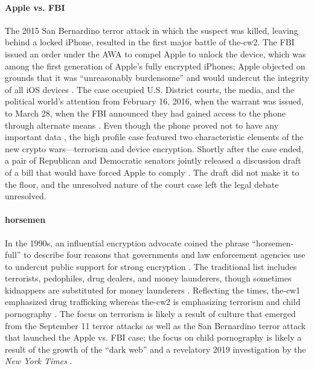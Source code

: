 \paragraph*{Apple vs. FBI} The 2015 San Bernardino terror attack in which the suspect was killed, leaving behind a
locked iPhone, resulted in the first major battle of \ac{the-cw2}. The \ac{FBI} issued an order under the \acrlong{AWA}
to compel Apple to unlock the device, which was among the first generation of Apple's fully encrypted iPhones; Apple
objected on grounds that it was ``unreasonably burdensome'' and would undercut the integrity of all iOS devices
\cite{schulze_clipper_2017}. The case occupied U.S. District courts, the media, and the political world's attention from
February 16, 2016, when the warrant was issued, to March 28, when the \ac{FBI} announced they had gained access to the
phone through alternate means \cite{novet_2016}. Even though the phone proved not to have any important data
\cite{schulze_clipper_2017}, the high profile case featured two characteristic elements of the new crypto
wars---terrorism and device encryption. Shortly after the case ended, a pair of Republican and Democratic senators
jointly released a discussion draft of a bill that would have forced Apple to comply \cite{burr_2016}. The draft did not
make it to the floor, and the unresolved nature of the court case left the legal debate unresolved.

\paragraph*{\Ac{horsemen}} In the 1990s, an influential encryption advocate coined the phrase ``\ac{horsemen-full}'' to
describe four reasons that governments and law enforcement agencies use to undercut public support for strong encryption
\cite{may_1994}. The traditional list includes terrorists, pedophiles, drug dealers, and money launderers, though
sometimes kidnappers are substituted for money launderers \cite{schneier_scaring_2019}. Reflecting the times,
\ac{the-cw1} emphasized drug trafficking whereas \ac{the-cw2} is emphasizing terrorism and child pornography
\cite{schulze_clipper_2017}. The focus on terrorism is likely a result of culture that emerged from the September 11
terror attacks as well as the San Bernardino terror attack that launched the Apple vs. \ac{FBI} case; the focus on child
pornography is likely a result of the growth of the ``dark web'' and a revelatory 2019 investigation by the \textit{New
York Times} \cite{keller_internet_2019}.


